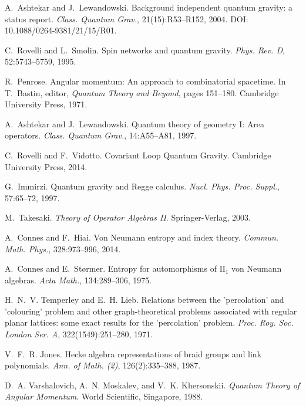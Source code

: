 \documentclass[11pt]{article}
\begin{document}
\begin{thebibliography}{9}
  A.~Ashtekar and J.~Lewandowski.
  \newblock Background independent quantum gravity: a status report.
  \newblock \emph{Class. Quantum Grav.}, 21(15):R53--R152, 2004.
  \newblock DOI: 10.1088/0264-9381/21/15/R01.

  C.~Rovelli and L.~Smolin.
  \newblock Spin networks and quantum gravity.
  \newblock \emph{Phys. Rev. D}, 52:5743--5759, 1995.

  R.~Penrose.
  \newblock Angular momentum: An approach to combinatorial spacetime.
  \newblock In T.~Bastin, editor, \emph{Quantum Theory and Beyond},
  \newblock pages 151--180. Cambridge University Press, 1971.

  A.~Ashtekar and J.~Lewandowski.
  \newblock Quantum theory of geometry I: Area operators.
  \newblock \emph{Class. Quantum Grav.}, 14:A55--A81, 1997.

  C.~Rovelli and F.~Vidotto.
  \newblock Covariant Loop Quantum Gravity.
  \newblock Cambridge University Press, 2014.

  G.~Immirzi.
  \newblock Quantum gravity and Regge calculus.
  \newblock \emph{Nucl. Phys. Proc. Suppl.}, 57:65--72, 1997.

  M.~Takesaki.
  \newblock \emph{Theory of Operator Algebras II}.
  \newblock Springer-Verlag, 2003.

  A.~Connes and F.~Hiai.
  \newblock Von Neumann entropy and index theory.
  \newblock \emph{Commun. Math. Phys.}, 328:973--996, 2014.

  A.~Connes and E.~Størmer.
  \newblock Entropy for automorphisms of $\text{II}_1$ von Neumann algebras.
  \newblock \emph{Acta Math.}, 134:289--306, 1975.

  H.~N.~V. Temperley and E.~H. Lieb.
  \newblock Relations between the 'percolation' and 'colouring' problem and other graph-theoretical problems associated with regular planar lattices: some exact results for the 'percolation' problem.
  \newblock \emph{Proc. Roy. Soc. London Ser. A}, 322(1549):251--280, 1971.

  V.~F.~R. Jones.
  \newblock Hecke algebra representations of braid groups and link polynomials.
  \newblock \emph{Ann. of Math. (2)}, 126(2):335--388, 1987.

  D.~A. Varshalovich, A.~N. Moskalev, and V.~K. Khersonskii.
  \newblock \emph{Quantum Theory of Angular Momentum}.
  \newblock World Scientific, Singapore, 1988.


\end{thebibliography}
\end{document}
